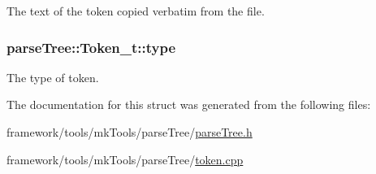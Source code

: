 The text of the token copied verbatim from the file. 

\subsubsection[{\texorpdfstring{type}{type}}]{ parse\+Tree\+::\+Token\+\_\+t\+::type}\hypertarget{structparse_tree_1_1_token__t_a97c48431de51258f22ffda5d53c0b76d}{}\label{structparse_tree_1_1_token__t_a97c48431de51258f22ffda5d53c0b76d}


The type of token. 



The documentation for this struct was generated from the following files\+:\begin{DoxyCompactItemize}
\item 
framework/tools/mk\+Tools/parse\+Tree/\hyperlink{parse_tree_8h}{parse\+Tree.\+h}\item 
framework/tools/mk\+Tools/parse\+Tree/\hyperlink{token_8cpp}{token.\+cpp}\end{DoxyCompactItemize}
